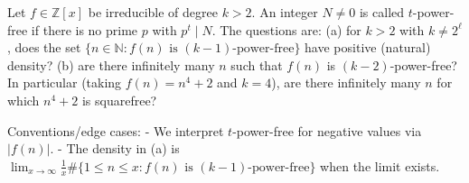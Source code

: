 Let $f\in\mathbb Z[x]$ be irreducible of degree $k>2$.
An integer $N\ne 0$ is called $t$-power-free if there is no prime $p$ with $p^t\mid N$.
The questions are:
(a) for $k>2$ with $k\ne 2^\ell$, does the set $\{n\in\mathbb N: f(n)\text{ is }(k-1)\text{-power-free}\}$ have positive (natural) density?
(b) are there infinitely many $n$ such that $f(n)$ is $(k-2)$-power-free?
In particular (taking $f(n)=n^4+2$ and $k=4$), are there infinitely many $n$ for which $n^4+2$ is squarefree?

Conventions/edge cases:
- We interpret $t$-power-free for negative values via $|f(n)|$.
- The density in (a) is $\lim_{x\to\infty}\frac1x\#\{1\le n\le x: f(n)\text{ is }(k-1)\text{-power-free}\}$ when the limit exists.
